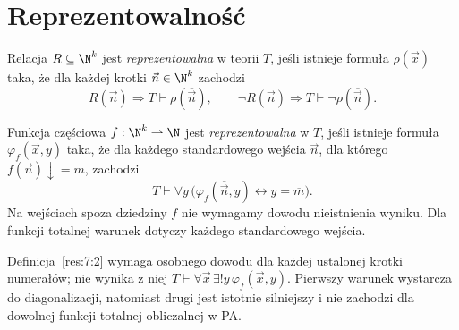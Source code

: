\section{Reprezentowalność}\label{sec:reprezentowalnosc}

\begin{definicja}\label{res:7:1}
Relacja $R\subseteq\N^k$ jest \emph{reprezentowalna} w teorii $T$, jeśli istnieje formuła $\rho(\vec x)$ taka, że dla każdej krotki $\vec n\in\N^k$ zachodzi
\[
R(\vec n)\Longrightarrow T\vdash\rho(\overline{\vec n}),\qquad
\neg R(\vec n)\Longrightarrow T\vdash\neg\rho(\overline{\vec n}).
\]
\end{definicja}

\begin{definicja}\label{res:7:2}
Funkcja częściowa $f:\N^k\rightharpoonup\N$ jest \emph{reprezentowalna} w $T$, jeśli istnieje formuła $\varphi_f(\vec x,y)$ taka, że dla każdego standardowego wejścia $\vec n$, dla którego $f(\vec n)\downarrow=m$, zachodzi
\[
T\vdash\forall y\,\bigl(\varphi_f(\overline{\vec n},y)
\leftrightarrow y=\overline m\bigr).
\]
Na wejściach spoza dziedziny $f$ nie wymagamy dowodu nieistnienia wyniku. Dla funkcji totalnej warunek dotyczy każdego standardowego wejścia.
\end{definicja}

\begin{uwaga}\label{res:7:3}
Definicja~\ref{res:7:2} wymaga osobnego dowodu dla każdej ustalonej krotki numerałów; nie wynika z niej $T\vdash\forall\vec x\,\exists!y\,\varphi_f(\vec x,y)$. Pierwszy warunek wystarcza do diagonalizacji, natomiast drugi jest istotnie silniejszy i nie zachodzi dla dowolnej funkcji totalnej obliczalnej w PA.
\end{uwaga}

